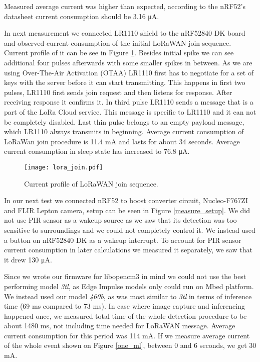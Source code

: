 Measured average current was higher than expected, according to the nRF52's datasheet\cite{nrf52_datasheet} current consumption should be 3.16 \si{\micro\ampere}.

In next measurement we connected LR1110 shield to the nRF52840 DK board and observed current consumption of the initial LoRaWAN join sequence.
Current profile of it can be see in Figure \ref{lora_join}.
Besides initial spike we can see additional four pulses afterwards with some smaller spikes in between. 
As we are using Over-The-Air Activation (OTAA) LR1110 first has to negotiate for a set of keys with the server before it can start transmitting.
This happens in first two pulses, LR1110 first sends join request and then listens for response.
After receiving response it confirms it.
In third pulse LR1110 sends a message that is a part of the LoRa Cloud service.
This message is specific to LR1110 and it can not be completely disabled.
Last thin pulse belongs to an empty payload message, which LR1110 always transmits in beginning.
Average current consumption of LoRaWan join procedure is 11.4 \si{\milli\ampere} and lasts for about 34 seconds.
Average current consumption in sleep state has increased to 76.8 \si{\micro\ampere}.

\begin{figure}[ht]
    \centering
    \texttt{[image: lora\_join.pdf]}
    \caption{ Current profile of LoRaWAN join sequence.}
    \label{lora_join}
\end{figure}

In our next test we connected nRF52 to boost converter circuit, Nucleo-F767ZI and FLIR Lepton camera, setup can be seen in Figure \ref{measure_setup}.
We did not use PIR sensor as a wakeup source as we saw that its detection was too sensitive to surroundings and we could not completely control it.
We instead used a button on nRF52840 DK as a wakeup interrupt.
To account for PIR sensor current consumption in later calculations we measured it separately, we saw that it drew 130 \si{\micro\ampere}.

Since we wrote our firmware for libopencm3 in mind we could not use the best performing model \textit{3tl}, as Edge Impulse models only could run on Mbed platform.
We instead used our model \textit{460b}, as was most similar to \textit{3tl} in terms of inference time (69 \si{\milli\second} compared to 73 \si{\milli\second}).
In case where image capture and inferencing happened once, we measured total time of the whole detection procedure to be about 1480 \si{\milli\second}, not including time needed for LoRaWAN message.
Average current consumption for this period was 114 \si{\milli\ampere}.
If we measure average current of the whole event shown on Figure \ref{one_ml}, between 0 and 6 seconds, we get 30 \si{\milli\ampere}.

